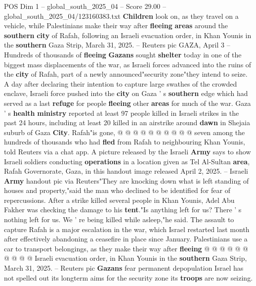 \begin{textsample}{POS Dim 1 – global\_south\_2025\_04 – Score 29.00 – global\_south\_2025\_04/123160383.txt}  \label{ex:f1_pos_286}
\textbf{Children} look on, as they travel on a vehicle, while Palestinians make their way after \textbf{fleeing} \textbf{areas} around the \textbf{southern} \textbf{city} of Rafah, following an Israeli evacuation order, in Khan Younis in the \textbf{southern} Gaza Strip, March 31, 2025. -- Reuters pic GAZA, April 3 -- Hundreds of thousands of \textbf{fleeing} \textbf{Gazans} sought \textbf{shelter} today in one of the biggest mass displacements of the war, as Israeli forces advanced into the ruins of the \textbf{city} of Rafah, part of a newly announced"security zone"they intend to seize.
A day after declaring their intention to capture large swathes of the crowded enclave, Israeli force pushed into the \textbf{city} on Gaza ' s \textbf{southern} edge which had served as a last \textbf{refuge} for people \textbf{fleeing} other \textbf{areas} for much of the war.
Gaza ' s \textbf{health} \textbf{ministry} reported at least 97 people killed in Israeli strikes in the past 24 hours, including at least 20 killed in an airstrike around \textbf{dawn} in Shejaia suburb of Gaza \textbf{City}.
Rafah"is gone, @ @ @ @ @ @ @ @ @ @ seven among the hundreds of thousands who had \textbf{fled} from Rafah to neighbouring Khan Younis, told Reuters via a chat app.
A picture released by the Israeli \textbf{Army} says to show Israeli soldiers conducting \textbf{operations} in a location given as Tel Al-Sultan \textbf{area}, Rafah Governorate, Gaza, in this handout image released April 2, 2025. -- Israeli \textbf{Army} handout pic via Reuters"They are knocking down what is left standing of houses and property,"said the man who declined to be identified for fear of repercussions.
After a strike killed several people in Khan Younis, Adel Abu Fakher was checking the damage to his \textbf{tent}."Is anything left for us?
There ' s nothing left for us.
We ' re being killed while asleep,"he said.
The assault to capture Rafah is a major escalation in the war, which Israel restarted last month after effectively abandoning a ceasefire in place since January.
Palestinians use a car to transport belongings, as they make their way after \textbf{fleeing} @ @ @ @ @ @ @ @ @ @ Israeli evacuation order, in Khan Younis in the \textbf{southern} Gaza Strip, March 31, 2025. -- Reuters pic \textbf{Gazans} fear permanent depopulation Israel has not spelled out its longterm aims for the security zone its \textbf{troops} are now seizing.

\end{textsample}

